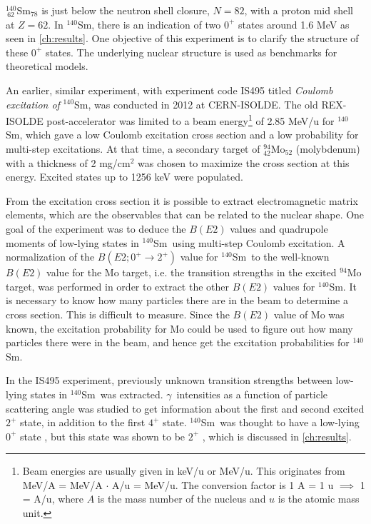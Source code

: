 \documentclass[twoside,english]{uiofysmaster/uiofysmaster}
\newcommand{\Sm}{$^{140}$Sm} %
\newcommand{\ga}{$\gamma$}
\let\orgautoref\autoref
\renewcommand{\autoref}
        {%
		 \def\sectionautorefname{Section}%
		 \def\subsectionautorefname{Section}%
		 \def\subsubsectionautorefname{Section}%
		 \def\chapterautorefname{Chapter}%
          \orgautoref}
\begin{document}
$^{140}_{~62}$Sm$_{78}$ is just below the neutron shell closure, $N = 82$, with a proton mid shell at $Z = 62$. 
In \Sm, there is an indication of two $0^+$ states around 1.6 MeV as seen in \autoref{ch:results}. 
One objective of this experiment is to clarify the structure of these $0^+$ states. 
The underlying nuclear structure is used as benchmarks for theoretical models.

An earlier, similar experiment, with experiment code IS495 titled \textit{Coulomb excitation of} \Sm, was conducted in 2012 at CERN-ISOLDE.
The old REX-ISOLDE post-accelerator was limited to a beam energy\footnote{Beam energies are usually given in keV/u or MeV/u. This originates from MeV/A = MeV/A $\cdot$ A/u = MeV/u. The conversion factor is 1 A = 1 u $\implies$ 1 = A/u, where $A$ is the mass number of the nucleus and $u$ is the atomic mass unit.} of 2.85 MeV/u for \Sm, which gave a low Coulomb excitation cross section and a low probability for multi-step excitations. 
At that time, a secondary target of $^{94}_{42}$Mo$_{52}$ (molybdenum) with a thickness of 2 mg/cm$^2$ was chosen to maximize the cross section at this energy.
Excited states up to 1256 keV were populated.

From the excitation cross section it is possible to extract electromagnetic matrix elements, which are the observables that can be related to the nuclear shape.
One goal of the experiment was to deduce the $B(E2)$ values and quadrupole moments of low-lying states in \Sm\ using multi-step Coulomb excitation.
A normalization of the $B(E2; 0^+ \rightarrow 2^+)$ value for \Sm\ to the well-known $B(E2)$ value for the Mo target, i.e. the transition strengths in the excited $^{94}$Mo target, was performed in order to extract the other $B(E2)$ values for \Sm.
It is necessary to know how many particles there are in the beam to determine a cross section.
This is difficult to measure.
Since the $B(E2)$ value of Mo was known, the excitation probability for Mo could be used to figure out how many particles there were in the beam, and hence get the excitation probabilities for \Sm.

In the IS495 experiment, previously unknown transition strengths between low-lying states in \Sm\ was extracted. 
\ga\ intensities as a function of particle scattering angle was studied to get information about the first and second excited $2^+$ state, in addition to the first $4^+$ state.
\Sm\ was thought to have a low-lying $0^+$ state \cite{Firestone}, but this state was shown to be $2^+$ \cite{Samorajczyk2015}, which is discussed in \autoref{ch:results}. 
\end{document}
